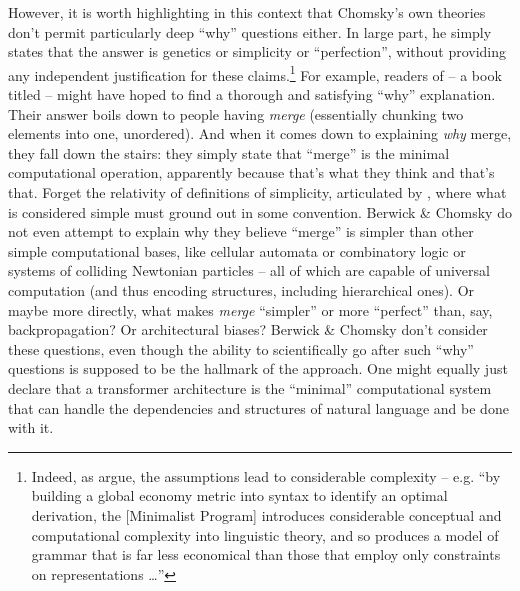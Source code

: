 \documentclass[output=paper,colorlinks,citecolor=brown]{langscibook}
\begin{document}
However, it is worth highlighting in this context that Chomsky's own theories don't permit particularly deep ``why'' questions either. In large part, he simply states that the answer is genetics or simplicity or ``perfection'', without providing any independent justification for these claims.\footnote{Indeed, as \citet{johnson1997critique} argue, the assumptions lead to considerable complexity -- e.g. ``by building a global economy  metric into syntax to identify an optimal derivation, the [Minimalist Program] introduces considerable conceptual and computational complexity into linguistic theory, and so produces a model of grammar that is far less economical than those that employ only constraints on representations \ldots''} For example, readers of  -- a book titled  -- might have hoped to find a thorough and satisfying ``why'' explanation. Their answer boils down to people having \textit{merge} (essentially chunking two elements into one, unordered). And when it comes down to explaining \textit{why} merge, they fall down the stairs: they simply state that ``merge'' is the minimal computational operation, apparently because that's what they think and that's that. Forget the relativity of definitions of simplicity, articulated by \citet{goodman1965new}, where what is considered simple must ground out in some convention. Berwick \& Chomsky do not even attempt to explain why they believe ``merge'' is simpler than other simple computational bases, like cellular automata or combinatory logic or systems of colliding Newtonian particles -- all of which are capable of universal computation (and thus encoding structures, including hierarchical ones). Or maybe more directly, what makes \textit{merge} ``simpler'' or more ``perfect'' than, say, backpropagation? Or  architectural biases? Berwick \& Chomsky don't consider these questions, even though the ability to scientifically go after such ``why'' questions is supposed to be the hallmark of the approach. One might equally just declare that a transformer architecture is the ``minimal'' computational system that can handle the dependencies and structures of natural language and be done with it.
\end{document}
